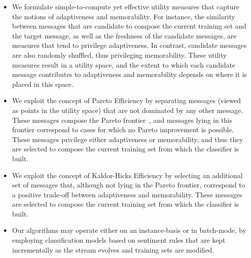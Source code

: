 \documentclass{sig-alternate}
\begin{document}
\begin{itemize}
\item We formulate simple-to-compute yet effective utility measures that capture the notions of adaptiveness and memorability. For instance, the similarity between messages that are candidate to compose the current training set and the target message, as well as the freshness of the candidate messages, are measures that tend to privilege adaptiveness. In contrast, candidate messages are also randomly shuffled, thus privileging memorability. These utility measures result in a utility space, and the extent to which each candidate message contributes to adaptiveness and memorability depends on where it is placed in this space.
\item We exploit the concept of Pareto Efficiency by separating messages (viewed as points in the utility space) that are not dominated by any other message. These messages compose the Pareto frontier~\cite{palda@book}, and messages lying in this frontier correspond to cases for which no Pareto improvement is possible. These messages privilege either adaptiveness or memorability, and thus they are selected to compose the current training set from which the classifier is built.
\item We exploit the concept of Kaldor-Hicks Efficiency by selecting an additional set of messages that, although not lying in the Pareto frontier, correspond to a positive trade-off between adaptiveness and memorability. These messages are selected to compose the current training set from which the classifier is built.
\item Our algorithms may operate either on an instance-basis or in batch-mode, by employing classification models based on sentiment rules that are kept incrementally as the stream evolves and training sets are modified.
\end{itemize}

\end{document}
